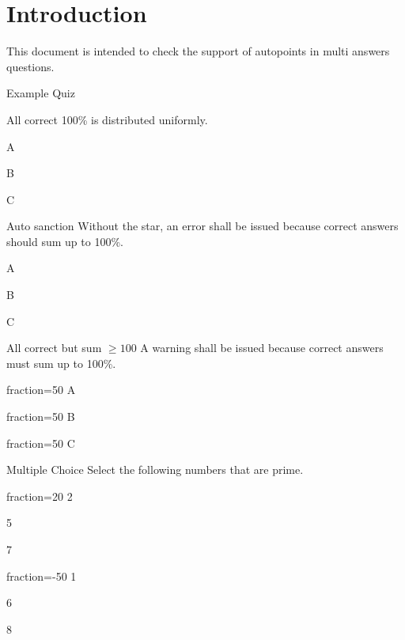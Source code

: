 \documentclass{article}
\begin{document}
\section*{Introduction}

This document is intended to check the support of autopoints in multi answers 
questions.

\begin{quiz}{Example Quiz}
\begin{multi}[multiple]{All correct}
100\% is distributed uniformly.
\item* A
\item* B
\item* C
\end{multi}
\begin{multi}[multiple]{Auto sanction}
Without the star, an error shall be issued because correct answers should sum 
up to 100\%.
\item* A
\item B
\item C
\end{multi}
\begin{multi}[multiple]{All correct but sum $\geq 100$}
A warning shall be issued because correct answers must sum up to 100\%.
\item[fraction=50] A
\item[fraction=50] B
\item[fraction=50] C
\end{multi}
\begin{multi}[multiple]{Multiple Choice}
Select the following numbers that are prime.
\item[fraction=20] 2
\item* 5
\item* 7
\item[fraction=-50] 1
\item 6
\item 8
\end{multi}
\end{quiz}
\end{document}
